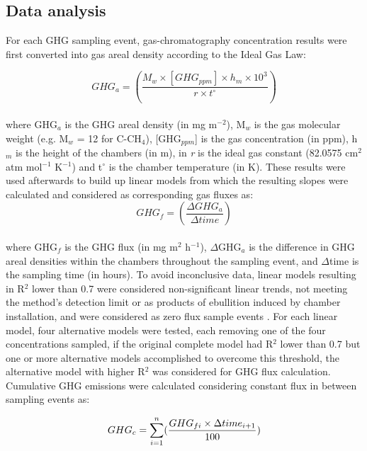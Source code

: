 \subsection{Data analysis}
\label{sec:meth_Stat}

For each GHG sampling event, gas-chromatography concentration results were first converted into gas areal density according to the Ideal Gas Law: 

\begin{equation} \label{GHG_a}
GHG_{a} = (\frac{M_w \times [GHG_{ppm}] \times h_m  \times 10^3}{r  \times t^{\circ}})
\end{equation}\\

where GHG$_{a}$ is the GHG areal density (in mg m$^{-2}$), M$_{w}$ is the gas molecular weight (e.g. M$_{w}$ = 12 for C-CH$_{4}$), [GHG$_{ppm}$] is the gas concentration (in ppm), h$_{m}$ is the height of the chambers (in m), in \textit{r} is the ideal gas constant (82.0575 cm$^{2}$ atm mol$^{-1}$ K$^{-1}$) and t$^{\circ}$ is the chamber temperature (in K). These results were used afterwards to build up linear models from which the resulting slopes were calculated and considered as corresponding gas fluxes as:\\

\begin{equation}
GHG_{f} = (\frac{\Delta GHG_{a}}{\Delta time})
\end{equation}\\

where GHG$_{f}$ is the GHG flux (in mg m$^{2}$ h$^{-1}$), $\Delta$GHG$_{a}$ is the difference in GHG areal densities within the chambers throughout the sampling event, and $\Delta$time is the sampling time (in hours). To avoid inconclusive data, linear models resulting in R$^{2}$ lower than 0.7 were considered non-significant linear trends, not meeting the method's detection limit or as products of ebullition induced by chamber installation, and were considered as zero flux sample events \citep{schultz2023}. For each linear model, four alternative models were tested, each removing one of the four concentrations sampled, if the original complete model had R$^{2}$ lower than 0.7 but one or more alternative models accomplished to overcome this threshold, the alternative model with higher R$^{2}$ was considered for GHG flux calculation. Cumulative GHG emissions were calculated considering constant flux in between sampling events as:

\begin{equation}
GHG_{c} = \sum_{i=1} ^{n}(\frac{GHG_{f\space i} \times \Delta time_{i+1}}{100})
\end{equation}\\

